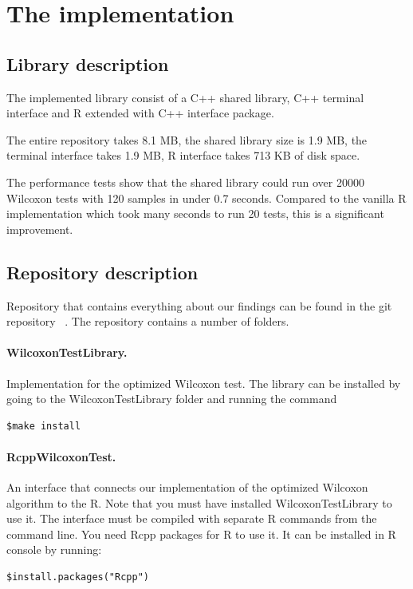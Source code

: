 \documentclass[12pt]{article}
\begin{document}
{\newpage

\section{The implementation}

\subsection{Library description}
The implemented library consist of a C++ shared library, C++ terminal interface and R extended with C++ interface package.

The entire repository takes 8.1 MB, the shared library size is 1.9 MB, the terminal interface takes 1.9 MB, R interface takes 713 KB of disk space.

The performance tests show that the shared library could run over 20000 Wilcoxon tests with 120 samples in under 0.7 seconds. Compared to the vanilla R implementation which took many seconds to run 20 tests, this is a significant improvement.

\subsection{Repository description}

Repository that contains everything about our findings can be found in the git repository ~\cite{wilx_repo}. The repository contains a number of folders.

\paragraph{WilcoxonTestLibrary.}
Implementation for the optimized Wilcoxon test. The library can be installed by going to the WilcoxonTestLibrary folder and running the command

\begin{lstlisting}
$make install
\end{lstlisting}

\paragraph{RcppWilcoxonTest.}
An interface that connects our implementation of the optimized Wilcoxon algorithm to the R. Note that you must have installed WilcoxonTestLibrary to use it. The interface must be compiled with separate R commands from the command line. You need Rcpp packages for R to use it. It can be installed in R console by running:
\begin{lstlisting}
$install.packages("Rcpp")
\end{lstlisting}

}
\end{document}
